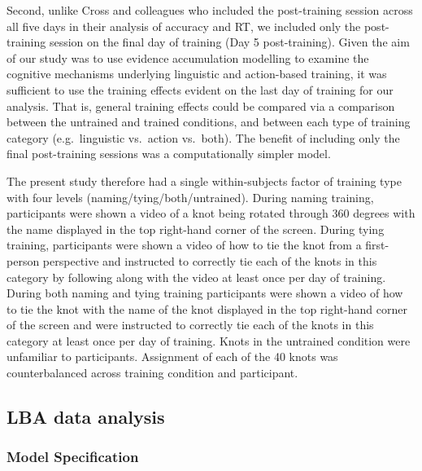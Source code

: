 \documentclass[
  man, donotrepeattitle,floatsintext]{apa6}
\begin{document}
Second, unlike Cross and colleagues who included the post-training session across all five days in their analysis of accuracy and RT, we included only the post-training session on the final day of training (Day 5 post-training). Given the aim of our study was to use evidence accumulation modelling to examine the cognitive mechanisms underlying linguistic and action-based training, it was sufficient to use the training effects evident on the last day of training for our analysis. That is, general training effects could be compared via a comparison between the untrained and trained conditions, and between each type of training category (e.g.~linguistic vs.~action vs.~both). The benefit of including only the final post-training sessions was a computationally simpler model.

The present study therefore had a single within-subjects factor of training type with four levels (naming/tying/both/untrained). During naming training, participants were shown a video of a knot being rotated through 360 degrees with the name displayed in the top right-hand corner of the screen. During tying training, participants were shown a video of how to tie the knot from a first-person perspective and instructed to correctly tie each of the knots in this category by following along with the video at least once per day of training. During both naming and tying training participants were shown a video of how to tie the knot with the name of the knot displayed in the top right-hand corner of the screen and were instructed to correctly tie each of the knots in this category at least once per day of training. Knots in the untrained condition were unfamiliar to participants. Assignment of each of the 40 knots was counterbalanced across training condition and participant.

\subsection{LBA data analysis}\label{lba-data-analysis}

\subsubsection{Model Specification}\label{model-specification}
\end{document}

